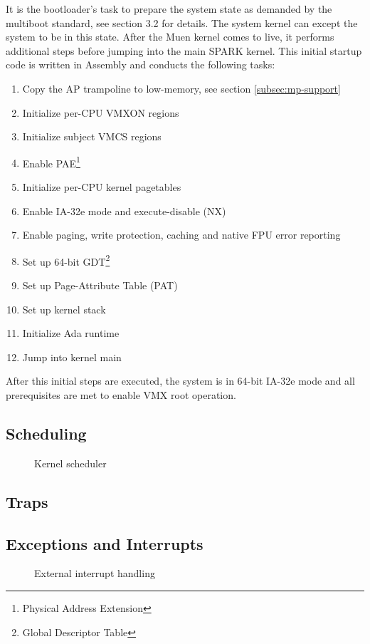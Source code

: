 It is the bootloader's task to prepare the system state as demanded by the
multiboot standard, see \cite{multiboot} section 3.2 for details. The system
kernel can except the system to be in this state. After the Muen kernel comes to
live, it performs additional steps before jumping into the main SPARK kernel.
This initial startup code is written in Assembly and conducts the following
tasks:
\begin{enumerate}
	\item Copy the AP trampoline to low-memory, see section
		\ref{subsec:mp-support} \item Initialize per-CPU VMXON regions
	\item Initialize subject VMCS regions
	\item Enable PAE\footnote{Physical Address Extension}
	\item Initialize per-CPU kernel pagetables
	\item Enable IA-32e mode and execute-disable (NX)
	\item Enable paging, write protection, caching and native FPU error
		reporting
	\item Set up 64-bit GDT\footnote{Global Descriptor Table}
	\item Set up Page-Attribute Table (PAT)
	\item Set up kernel stack
	\item Initialize Ada runtime
	\item Jump into kernel main
\end{enumerate}
After this initial steps are executed, the system is in 64-bit IA-32e mode and
all prerequisites are met to enable VMX root operation.

\subsection{Scheduling}
\begin{figure}[h]
	\centering
	
	\caption{Kernel scheduler}
	\label{fig:kernel-scheduler}
\end{figure}

\subsection{Traps}
\subsection{Exceptions and Interrupts}
\begin{figure}[h]
	\centering
	
	\caption{External interrupt handling}
	\label{fig:external-interrupt}
\end{figure}

